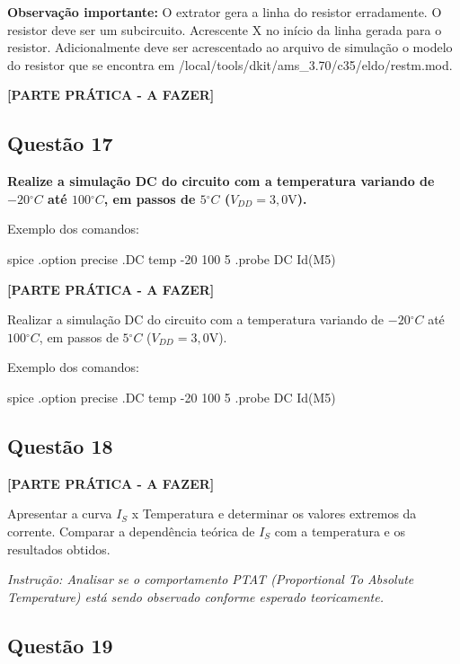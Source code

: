 \documentclass[12pt,a4paper]{article}
\newcommand{\degree}{\ensuremath{{}^\circ}}
\begin{document}
\textbf{Observação importante:} O extrator gera a linha do resistor erradamente. O resistor deve ser um subcircuito. Acrescente X no início da linha gerada para o resistor. Adicionalmente deve ser acrescentado ao arquivo de simulação o modelo do resistor que se encontra em /local/tools/dkit/ams\_3.70/c35/eldo/restm.mod.

\textbf{[PARTE PRÁTICA - A FAZER]}

\subsection*{Questão 17}

\textbf{Realize a simulação DC do circuito com a temperatura variando de $-20\degree C$ até $100\degree C$, em passos de $5\degree C$ ($V_{DD} = 3,0\text{V}$).}

Exemplo dos comandos:

\begin{codeblockm}{spice}
.option precise
.DC temp -20 100 5
.probe DC Id(M5)
\end{codeblockm}

\textbf{[PARTE PRÁTICA - A FAZER]}

Realizar a simulação DC do circuito com a temperatura variando de $-20\degree C$ até $100\degree C$, em passos de $5\degree C$ ($V_{DD} = 3,0\text{V}$).

Exemplo dos comandos:

\begin{codeblockm}{spice}
.option precise
.DC temp -20 100 5
.probe DC Id(M5)
\end{codeblockm}

\subsection*{Questão 18}

\textbf{[PARTE PRÁTICA - A FAZER]}

Apresentar a curva $I_S$ x Temperatura e determinar os valores extremos da corrente. Comparar a dependência teórica de $I_S$ com a temperatura e os resultados obtidos.

\textit{Instrução: Analisar se o comportamento PTAT (Proportional To Absolute Temperature) está sendo observado conforme esperado teoricamente.}

\subsection*{Questão 19}
\end{document}

